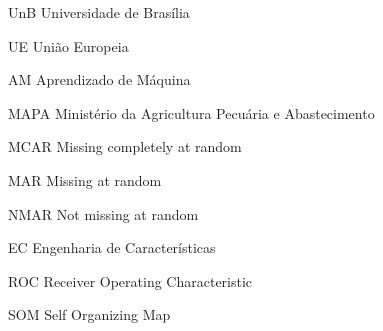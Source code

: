 \begin{siglas}
  \item[UnB] Universidade de Brasília
 	\item[UE] União Europeia
	\item[AM] Aprendizado de Máquina
	\item[MAPA] Ministério da Agricultura Pecuária e Abastecimento
	\item[MCAR] Missing completely at random
	\item[MAR] Missing at random
	\item[NMAR] Not missing at random
	\item[EC] Engenharia de Características
	\item[ROC] Receiver Operating Characteristic
	\item[SOM] Self Organizing Map
	\end{siglas}
